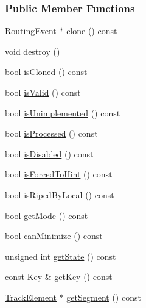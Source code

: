 \subsubsection*{Public Member Functions}
\begin{DoxyCompactItemize}
\item 
\mbox{\hyperlink{classKite_1_1RoutingEvent}{Routing\+Event}} $\ast$ \mbox{\hyperlink{classKite_1_1RoutingEvent_ad4469c7fdb58a5f0bda8755302e37021}{clone}} () const
\item 
void \mbox{\hyperlink{classKite_1_1RoutingEvent_a3a80b6032f86a56bec74609034b3246f}{destroy}} ()
\item 
bool \mbox{\hyperlink{classKite_1_1RoutingEvent_a213956f734f660863e55f8f398cf932a}{is\+Cloned}} () const
\item 
bool \mbox{\hyperlink{classKite_1_1RoutingEvent_a5bc2a781be2586924afce4e4a4ea6697}{is\+Valid}} () const
\item 
bool \mbox{\hyperlink{classKite_1_1RoutingEvent_af8b3ab994396ccd821f529c5c02760a5}{is\+Unimplemented}} () const
\item 
bool \mbox{\hyperlink{classKite_1_1RoutingEvent_a83943e04f0ee0a5a38208278b97fc780}{is\+Processed}} () const
\item 
bool \mbox{\hyperlink{classKite_1_1RoutingEvent_a50607443b762961229119228be30c5ad}{is\+Disabled}} () const
\item 
bool \mbox{\hyperlink{classKite_1_1RoutingEvent_a6e38564fbae008179d865f844acba59a}{is\+Forced\+To\+Hint}} () const
\item 
bool \mbox{\hyperlink{classKite_1_1RoutingEvent_ac460ce43ff71dcdf11091403c4ba9060}{is\+Riped\+By\+Local}} () const
\item 
bool \mbox{\hyperlink{classKite_1_1RoutingEvent_a150a8fe8d214e9de76153c1d20676a98}{get\+Mode}} () const
\item 
bool \mbox{\hyperlink{classKite_1_1RoutingEvent_a85d665e52caee3e804921f52417b0074}{can\+Minimize}} () const
\item 
unsigned int \mbox{\hyperlink{classKite_1_1RoutingEvent_a40ec2b23684a0e6e6d7ac9783a269037}{get\+State}} () const
\item 
const \mbox{\hyperlink{classKite_1_1RoutingEvent_1_1Key}{Key}} \& \mbox{\hyperlink{classKite_1_1RoutingEvent_ade1e79e88bf4f4c173ffd083dd5470c9}{get\+Key}} () const
\item 
\mbox{\hyperlink{classKite_1_1TrackElement}{Track\+Element}} $\ast$ \mbox{\hyperlink{classKite_1_1RoutingEvent_a506a4d1cef59fc35984c1c88e0c0f6df}{get\+Segment}} () const

\end{DoxyCompactItemize}

